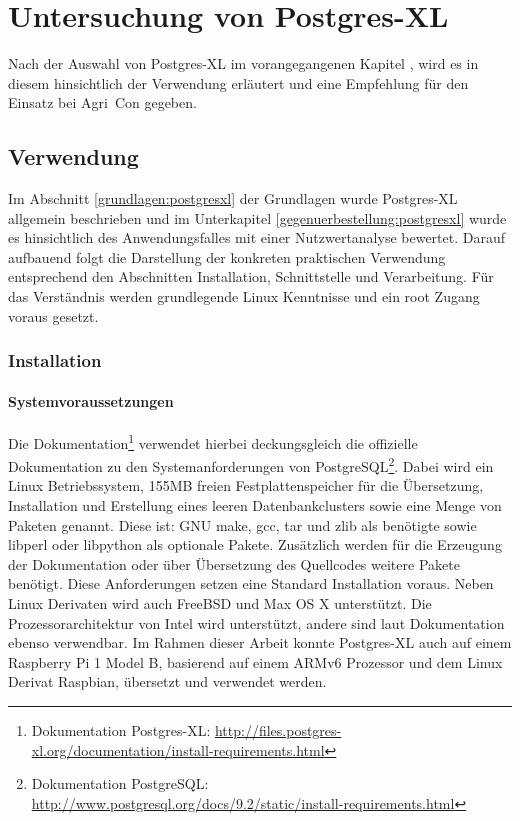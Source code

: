 \chapter{Untersuchung von Postgres-XL}
\label{chapter:postgresxl}

Nach der Auswahl von Postgres-XL im vorangegangenen Kapitel%
, wird es in diesem hinsichtlich der Verwendung erläutert und eine Empfehlung für den Einsatz bei Agri~Con gegeben.

\section{Verwendung}

Im Abschnitt \ref{grundlagen:postgresxl} der Grundlagen wurde Postgres-XL allgemein beschrieben und im Unterkapitel \ref{gegenuerbestellung:postgresxl} wurde es hinsichtlich des Anwendungsfalles mit einer Nutzwertanalyse bewertet.
Darauf aufbauend folgt die Darstellung der konkreten praktischen Verwendung entsprechend den Abschnitten Installation, Schnittstelle und Verarbeitung.
Für das Verständnis werden grundlegende Linux Kenntnisse und ein root Zugang voraus gesetzt.

\subsection{Installation}

\subsubsection{Systemvoraussetzungen}
Die Dokumentation\footnote{Dokumentation Postgres-XL: \url{http://files.postgres-xl.org/documentation/install-requirements.html}} verwendet hierbei deckungsgleich die offizielle Dokumentation zu den Systemanforderungen von PostgreSQL\footnote{Dokumentation PostgreSQL: \url{http://www.postgresql.org/docs/9.2/static/install-requirements.html}}.
Dabei wird ein Linux Betriebssystem, 155MB freien Festplattenspeicher für die Übersetzung, Installation und Erstellung eines leeren Datenbankclusters sowie eine Menge von Paketen genannt.
Diese ist: GNU make, gcc, tar und zlib als benötigte sowie libperl oder libpython als optionale Pakete.
Zusätzlich werden für die Erzeugung der Dokumentation oder über Übersetzung des Quellcodes weitere Pakete benötigt.
Diese Anforderungen setzen eine Standard Installation voraus.
Neben Linux Derivaten wird auch FreeBSD und Max OS X unterstützt.
Die Prozessorarchitektur von Intel wird unterstützt, andere sind laut Dokumentation ebenso verwendbar.
Im Rahmen dieser Arbeit konnte Postgres-XL auch auf einem Raspberry Pi 1 Model B, basierend auf einem ARMv6 Prozessor und dem Linux Derivat Raspbian, übersetzt und verwendet werden.

